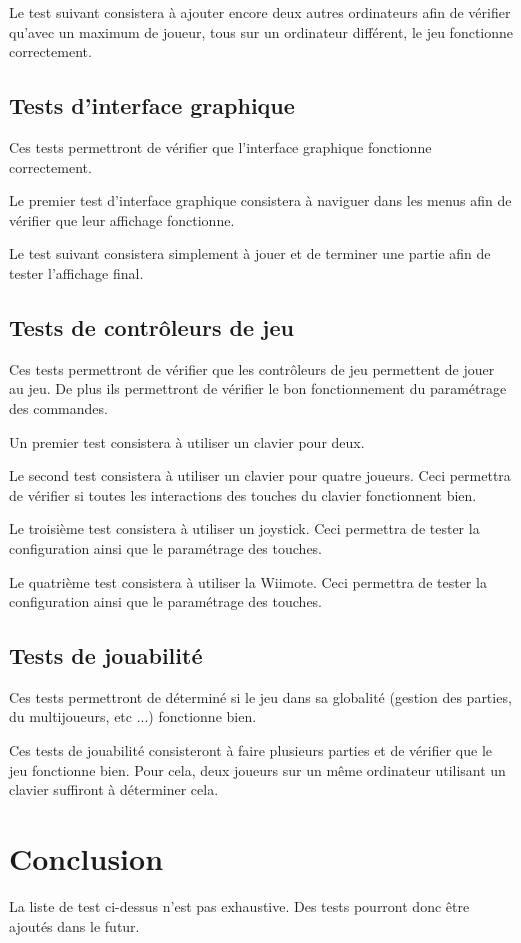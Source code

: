 Le test suivant consistera à ajouter encore deux autres ordinateurs afin de vérifier qu'avec un maximum de joueur, tous sur un ordinateur différent, le jeu fonctionne correctement.

\subsection{Tests d'interface graphique}

Ces tests permettront de vérifier que l'interface graphique fonctionne correctement.

Le premier test d'interface graphique consistera à naviguer dans les menus afin de vérifier que leur affichage fonctionne.

Le test suivant consistera simplement à jouer et de terminer une partie afin de tester l'affichage final.

\subsection{Tests de contrôleurs de jeu}

Ces tests permettront de vérifier que les contrôleurs de jeu permettent de jouer au jeu. De plus ils permettront de vérifier le bon fonctionnement du paramétrage des commandes.

Un premier test consistera à utiliser un clavier pour deux.

Le second test consistera à utiliser un clavier pour quatre joueurs. Ceci permettra de vérifier si toutes les interactions des touches du clavier fonctionnent bien.

Le troisième test consistera à utiliser un joystick. Ceci permettra de tester la configuration ainsi que le paramétrage des touches.

Le quatrième test consistera à utiliser la Wiimote. Ceci permettra de tester la configuration ainsi que le paramétrage des touches.

\subsection{Tests de jouabilité}

Ces tests permettront de déterminé si le jeu dans sa globalité (gestion des parties, du multijoueurs, etc ...) fonctionne bien.

Ces tests de jouabilité consisteront à faire plusieurs parties et de vérifier que le jeu fonctionne bien. Pour cela, deux joueurs sur un même ordinateur utilisant un clavier suffiront à déterminer cela.


\section*{Conclusion}

La liste de test ci-dessus n'est pas exhaustive. Des tests pourront donc être ajoutés dans le futur.
